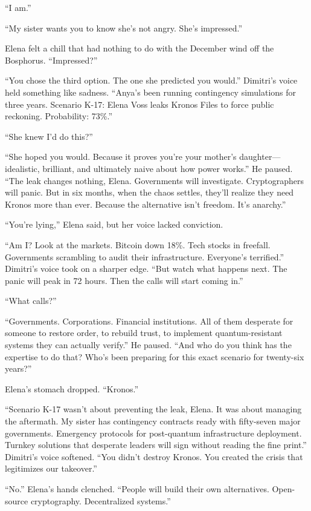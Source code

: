\documentclass[12pt,letterpaper]{book}
\begin{document}
``I am.''

``My sister wants you to know she's not angry. She's impressed.''

Elena felt a chill that had nothing to do with the December wind off the Bosphorus. ``Impressed?''

``You chose the third option. The one she predicted you would.'' Dimitri's voice held something like sadness. ``Anya's been running contingency simulations for three years. Scenario K-17: Elena Voss leaks Kronos Files to force public reckoning. Probability: 73\%.''

``She knew I'd do this?''

``She hoped you would. Because it proves you're your mother's daughter---idealistic, brilliant, and ultimately naive about how power works.'' He paused. ``The leak changes nothing, Elena. Governments will investigate. Cryptographers will panic. But in six months, when the chaos settles, they'll realize they need Kronos more than ever. Because the alternative isn't freedom. It's anarchy.''

``You're lying,'' Elena said, but her voice lacked conviction.

``Am I? Look at the markets. Bitcoin down 18\%. Tech stocks in freefall. Governments scrambling to audit their infrastructure. Everyone's terrified.'' Dimitri's voice took on a sharper edge. ``But watch what happens next. The panic will peak in 72 hours. Then the calls will start coming in.''

``What calls?''

``Governments. Corporations. Financial institutions. All of them desperate for someone to restore order, to rebuild trust, to implement quantum-resistant systems they can actually verify.'' He paused. ``And who do you think has the expertise to do that? Who's been preparing for this exact scenario for twenty-six years?''

Elena's stomach dropped. ``Kronos.''

``Scenario K-17 wasn't about preventing the leak, Elena. It was about managing the aftermath. My sister has contingency contracts ready with fifty-seven major governments. Emergency protocols for post-quantum infrastructure deployment. Turnkey solutions that desperate leaders will sign without reading the fine print.'' Dimitri's voice softened. ``You didn't destroy Kronos. You created the crisis that legitimizes our takeover.''

``No.'' Elena's hands clenched. ``People will build their own alternatives. Open-source cryptography. Decentralized systems.''
\end{document}
